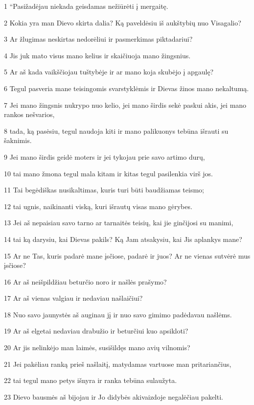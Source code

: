 \par 1 “Pasižadėjau niekada geisdamas nežiūrėti į mergaitę. 
\par 2 Kokia yra man Dievo skirta dalia? Ką paveldėsiu iš aukštybių nuo Visagalio? 
\par 3 Ar žlugimas neskirtas nedorėliui ir pasmerkimas piktadariui? 
\par 4 Jis juk mato visus mano kelius ir skaičiuoja mano žingsnius. 
\par 5 Ar aš kada vaikščiojau tuštybėje ir ar mano koja skubėjo į apgaulę? 
\par 6 Tegul pasveria mane teisingomis svarstyklėmis ir Dievas žinos mano nekaltumą. 
\par 7 Jei mano žingsnis nukrypo nuo kelio, jei mano širdis sekė paskui akis, jei mano rankos nešvarios, 
\par 8 tada, ką pasėsiu, tegul naudoja kiti ir mano palikuonys tebūna išrauti su šaknimis. 
\par 9 Jei mano širdis geidė moters ir jei tykojau prie savo artimo durų, 
\par 10 tai mano žmona tegul mala kitam ir kitas tegul pasilenkia virš jos. 
\par 11 Tai begėdiškas nusikaltimas, kuris turi būti baudžiamas teismo; 
\par 12 tai ugnis, naikinanti viską, kuri išrautų visas mano gėrybes. 
\par 13 Jei aš nepaisiau savo tarno ar tarnaitės teisių, kai jie ginčijosi su manimi, 
\par 14 tai ką darysiu, kai Dievas pakils? Ką Jam atsakysiu, kai Jis aplankys mane? 
\par 15 Ar ne Tas, kuris padarė mane įsčiose, padarė ir juos? Ar ne vienas sutvėrė mus įsčiose? 
\par 16 Ar aš neišpildžiau beturčio noro ir našlės prašymo? 
\par 17 Ar aš vienas valgiau ir nedaviau našlaičiui? 
\par 18 Nuo savo jaunystės aš auginau jį ir nuo savo gimimo padėdavau našlėms. 
\par 19 Ar aš elgetai nedaviau drabužio ir beturčiui kuo apsikloti? 
\par 20 Ar jis nelinkėjo man laimės, susišildęs mano avių vilnomis? 
\par 21 Jei pakėliau ranką prieš našlaitį, matydamas vartuose man pritariančius, 
\par 22 tai tegul mano petys išnyra ir ranka tebūna sulaužyta. 
\par 23 Dievo bausmės aš bijojau ir Jo didybės akivaizdoje negalėčiau pakelti. 
